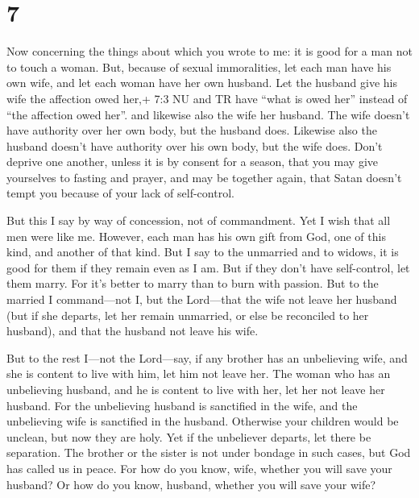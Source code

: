 \hypertarget{section-6}{%
\section{7}\label{section-6}}

 Now concerning the things about which you wrote to me: it
is good for a man not to touch a woman.  But, because of
sexual immoralities, let each man have his own wife, and let each woman
have her own husband.  Let the husband give his wife the
affection owed her,+ 7:3 NU and TR have ``what is owed her'' instead of
``the affection owed her''. and likewise also the wife her husband.
 The wife doesn't have authority over her own body, but the
husband does. Likewise also the husband doesn't have authority over his
own body, but the wife does.  Don't deprive one another,
unless it is by consent for a season, that you may give yourselves to
fasting and prayer, and may be together again, that Satan doesn't tempt
you because of your lack of self-control.

 But this I say by way of concession, not of commandment.
 Yet I wish that all men were like me. However, each man has
his own gift from God, one of this kind, and another of that kind.
 But I say to the unmarried and to widows, it is good for
them if they remain even as I am.  But if they don't have
self-control, let them marry. For it's better to marry than to burn with
passion.  But to the married I command---not I, but the
Lord---that the wife not leave her husband  (but if she
departs, let her remain unmarried, or else be reconciled to her
husband), and that the husband not leave his wife.

 But to the rest I---not the Lord---say, if any brother has
an unbelieving wife, and she is content to live with him, let him not
leave her.  The woman who has an unbelieving husband, and
he is content to live with her, let her not leave her husband.
 For the unbelieving husband is sanctified in the wife, and
the unbelieving wife is sanctified in the husband. Otherwise your
children would be unclean, but now they are holy.  Yet if
the unbeliever departs, let there be separation. The brother or the
sister is not under bondage in such cases, but God has called us in
peace.  For how do you know, wife, whether you will save
your husband? Or how do you know, husband, whether you will save your
wife?

